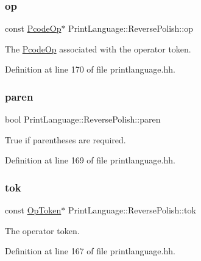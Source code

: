 \subsubsection{\texorpdfstring{op}{op}}
{\footnotesize\ttfamily const \mbox{\hyperlink{class_pcode_op}{Pcode\+Op}}$\ast$ Print\+Language\+::\+Reverse\+Polish\+::op}



The \mbox{\hyperlink{class_pcode_op}{Pcode\+Op}} associated with the operator token. 



Definition at line 170 of file printlanguage.\+hh.

\mbox{\label{struct_print_language_1_1_reverse_polish_abd7925ec148007f6794ae53bd862c448}} 
\subsubsection{\texorpdfstring{paren}{paren}}
{\footnotesize\ttfamily bool Print\+Language\+::\+Reverse\+Polish\+::paren}



True if parentheses are required. 



Definition at line 169 of file printlanguage.\+hh.

\mbox{\label{struct_print_language_1_1_reverse_polish_ac5309173a151a146eddc996c017b625a}} 
\subsubsection{\texorpdfstring{tok}{tok}}
{\footnotesize\ttfamily const \mbox{\hyperlink{class_op_token}{Op\+Token}}$\ast$ Print\+Language\+::\+Reverse\+Polish\+::tok}



The operator token. 



Definition at line 167 of file printlanguage.\+hh.

\mbox{\label{struct_print_language_1_1_reverse_polish_a9ba342eb7c3234b2e9449cd7349505ce}} 

